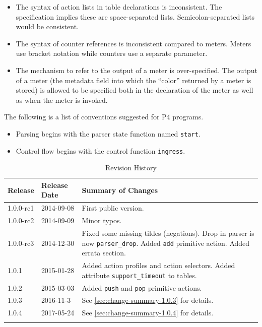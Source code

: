 \documentclass[12pt]{article}
\begin{document}


\begin{itemize}
\item The syntax of action lists in table declarations is inconsistent. The specification implies these are space-separated lists. Semicolon-separated lists would be consistent.
\item The syntax of counter references is inconsistent compared to meters. Meters use bracket notation while counters use a separate parameter.
\item The mechanism to refer to the output of a meter is over-specified. The output of a meter (the metadata field into which the ``color'' returned by a meter is stored) is allowed to be specified both in the declaration of the meter as well as when the meter is invoked.
\end{itemize}



The following is a list of conventions suggested for P4 programs.

\begin{itemize}
\item
Parsing begins with the parser state function named \texttt{start}.
\item
Control flow begins with the control function \texttt{ingress}.
\end{itemize}



\begin{table}[H]
\begin{center}
\begin{tabular}{| l | l | p{} |} \hline
\textbf{Release} &
\textbf{Release Date} &
\textbf{Summary of Changes} \\  \hline
1.0.0-rc1 & 2014-09-08 & First public version. \\  \hline
1.0.0-rc2 & 2014-09-09 & Minor typos. \\  \hline
1.0.0-rc3 & 2014-12-30 & Fixed some missing tildes (negations). Drop in parser is now \texttt{parser_drop}. Added \texttt{add} primitive action. Added errata section. \\  \hline
1.0.1 & 2015-01-28 & Added action profiles and action selectors. Added attribute \texttt{support_timeout} to tables. \\  \hline
1.0.2 & 2015-03-03 & Added \texttt{push} and \texttt{pop} primitive actions. \\  \hline
1.0.3 & 2016-11-3 & See \ref{sec:change-summary-1.0.3} for details. \\ \hline
1.0.4 & 2017-05-24 & See \ref{sec:change-summary-1.0.4} for details. \\ \hline
}
\end{tabular}
\end{center}
\caption{Revision History}
\label{tab:revhistory}
\end{table}
\end{document}
